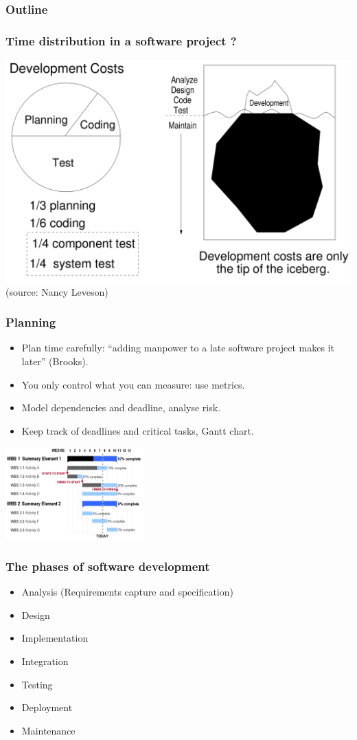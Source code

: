 \documentclass[10pt, handout]{beamer}
\begin{document}
\begin{frame}
  \frametitle{Outline}
  \tableofcontents[currentsection]
\end{frame}

\begin{frame}[fragile]
  \frametitle{Time distribution in a software project ?}
  \includegraphics[width=\textwidth]{soft_cost}
  \tiny(source: Nancy Leveson)
\end{frame}

\begin{frame}[fragile]
  \frametitle{Planning}
  \begin{itemize}
  \item Plan time carefully: ``adding manpower to a late software project
    makes it later'' (Brooks).
  \item You only control what you can measure: use metrics.
  \item Model dependencies and deadline, analyse risk.
  \item Keep track of deadlines and critical tasks, Gantt chart.
  \end{itemize}
  \begin{center}
    \includegraphics[width=0.4\textwidth]{gantt_chart}
  \end{center}
\end{frame}

\begin{frame}[fragile]
  \frametitle{The phases of software development}
  \begin{itemize}
  \item Analysis (Requirements capture and specification)
  \item Design
  \item Implementation
  \item Integration
  \item Testing
  \item Deployment
  \item Maintenance
  \end{itemize}
\end{frame}
\end{document}
